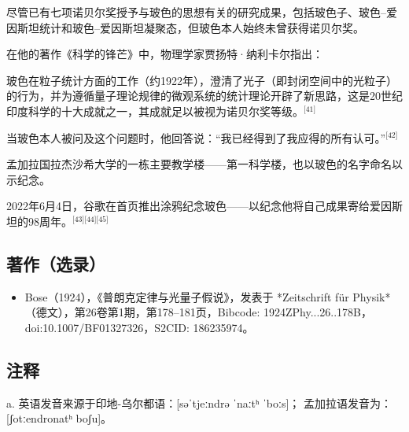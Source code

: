 尽管已有七项诺贝尔奖授予与玻色的思想有关的研究成果，包括玻色子、玻色–爱因斯坦统计和玻色–爱因斯坦凝聚态，但玻色本人始终未曾获得诺贝尔奖。

在他的著作《科学的锋芒》中，物理学家贾扬特·纳利卡尔指出：

玻色在粒子统计方面的工作（约1922年），澄清了光子（即封闭空间中的光粒子）的行为，并为遵循量子理论规律的微观系统的统计理论开辟了新思路，这是20世纪印度科学的十大成就之一，其成就足以被视为诺贝尔奖等级。\(^\text{[41]}\)

当玻色本人被问及这个问题时，他回答说：“我已经得到了我应得的所有认可。”\(^\text{[42]}\)

孟加拉国拉杰沙希大学的一栋主要教学楼——第一科学楼，也以玻色的名字命名以示纪念。

2022年6月4日，谷歌在首页推出涂鸦纪念玻色——以纪念他将自己成果寄给爱因斯坦的98周年。\(^\text{[43][44][45]}\)
\subsection{著作（选录）}
\begin{itemize}
\item Bose（1924），《普朗克定律与光量子假说》，发表于 *Zeitschrift für Physik*（德文），第26卷第1期，第178–181页，Bibcode: 1924ZPhy...26..178B，doi:10.1007/BF01327326，S2CID: 186235974。
\end{itemize}
\subsection{注释}

a. 英语发音来源于印地-乌尔都语：[səˈtjeːndrə ˈnaːtʰ ˈboːs]； 孟加拉语发音为：[ʃotːendronatʰ boʃu]。
